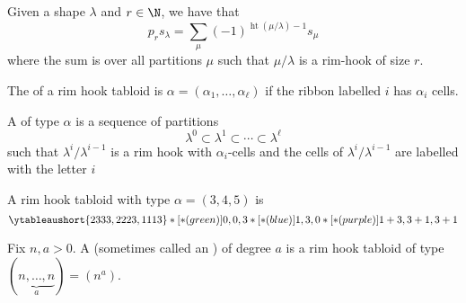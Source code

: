 \documentclass[11pt,leqno,oneside]{amsart}
\numberwithin{thm}{section}
\newcommand{\height}{\operatorname{ht}}
\begin{document}
\begin{thm}
  Given a shape \(\lambda\) and \(r \in \N\), we have that \[
    p_r s_\lambda = \sum_{\mu} (-1)^{\height(\mu/\lambda)-1} s_{\mu}
  \]
  where the sum is over all partitions \(\mu\) such that
  \(\mu/\lambda\) is a rim-hook of size \(r\). 
\end{thm}
\begin{defn}
  The  of a rim hook tabloid is \(\alpha = (\alpha_1,
  \ldots, \alpha_\ell)\) if the ribbon labelled \(i\) has \(\alpha_i\)
  cells. 
\end{defn}
\begin{defn}
  A  of type \(\alpha\) is a sequence of
  partitions \[
    \lambda^0 \subset \lambda^1 \subset \cdots \subset \lambda^\ell
  \]
  such that \(\lambda^i/\lambda^{i-1}\) is a rim hook with
  \(\alpha_i\)-cells and the cells of \(\lambda^i/\lambda^{i-1}\) are
  labelled with the letter \(i\)
\end{defn}
\begin{example} A rim hook tabloid with type \(\alpha = (3,4,5)\) is 
  \[
    \ytableaushort{2333,2223,1113}*[*(green)]{0,0,3}*[*(blue)]{1,3,0}*[*(purple)]{1+3,3+1,3+1}
  \]
\end{example}
\begin{defn}
  Fix \(n,a > 0\). A  (sometimes called an
  ) of degree \(a\) is a
  rim hook tabloid 
  of type \((\underbrace{n,\ldots,n}_{a}) = (n^a)\).
\end{defn}
\end{document}
